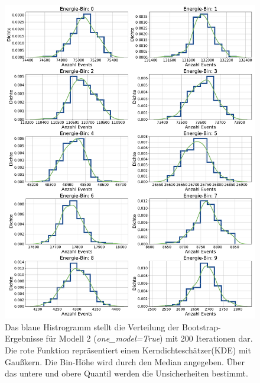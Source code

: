 \begin{figure}%
    \centering%
    \includegraphics[width=\textwidth]{Plots/DSEA/True/class_dist_10bins_16it_60ep_500000samples_200pulls.pdf}%
    \caption[Ergebnisse des Bootstrapping-Vefahrens für das 2. Modell in DSEA]{Das blaue Histrogramm stellt die Verteilung der Bootstrap-Ergebnisse für Modell 2 (\textit{one\_model=True}) mit 200 Iterationen dar.
    Die rote Funktion repräsentiert einen Kerndichteschätzer(KDE) mit Gaußkern.
    Die Bin-Höhe wird durch den Median angegeben.
    Über das untere und obere Quantil werden die Unsicherheiten bestimmt.
    }%
    \label{fig:dsea_bootstrap_true}%
\end{figure}%

